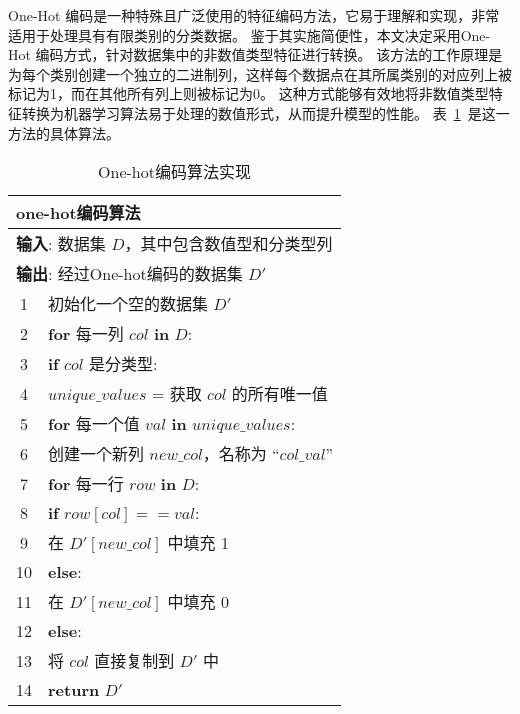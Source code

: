 One-Hot 编码是一种特殊且广泛使用的特征编码方法，它易于理解和实现，非常适用于处理具有有限类别的分类数据。
鉴于其实施简便性，本文决定采用One-Hot 编码方式，针对数据集中的非数值类型特征进行转换。
该方法的工作原理是为每个类别创建一个独立的二进制列，这样每个数据点在其所属类别的对应列上被标记为1，而在其他所有列上则被标记为0。
这种方式能够有效地将非数值类型特征转换为机器学习算法易于处理的数值形式，从而提升模型的性能。
表~\ref{tab:onehot}~是这一方法的具体算法。\par
\begin{table}[htbp]
	\caption{One-hot编码算法实现}
	\label{tab:onehot}
	\centering
	\begin{tabularx}{1.0\textwidth}{cl}
		\toprule
		\multicolumn{2}{l}{\textbf{one-hot编码算法}}                              \\
		\midrule
		\multicolumn{2}{l}{\textbf{输入}: 数据集 $D$，其中包含数值型和分类型列}   \\
		\multicolumn{2}{l}{\textbf{输出}: 经过One-hot编码的数据集 $D'$}           \\
		1  & 初始化一个空的数据集 $D'$                                            \\
		2  & \textbf{for} 每一列 $col$ \textbf{in} $D$:                           \\
		3  & \quad \textbf{if} $col$ 是分类型:                                    \\
		4  & \quad\quad $unique\_values$ = 获取 $col$ 的所有唯一值                \\
		5  & \quad\quad \textbf{for} 每一个值 $val$ \textbf{in} $unique\_values$: \\
		6  & \quad\quad\quad 创建一个新列 $new\_col$，名称为 ``$col\_val$''       \\
		7  & \quad\quad\quad \textbf{for} 每一行 $row$ \textbf{in} $D$:           \\
		8  & \quad\quad\quad\quad \textbf{if} $row[col] == val$:                  \\
		9  & \quad\quad\quad\quad\quad 在 $D'[new\_col]$ 中填充 1                 \\
		10 & \quad\quad\quad\quad \textbf{else}:                                  \\
		11 & \quad\quad\quad\quad\quad 在 $D'[new\_col]$ 中填充 0                 \\
		12 & \quad \textbf{else}:                                                 \\
		13 & \quad\quad 将 $col$ 直接复制到 $D'$ 中                               \\
		14 & \textbf{return} $D'$                                                 \\
		\bottomrule
	\end{tabularx}
\end{table}


